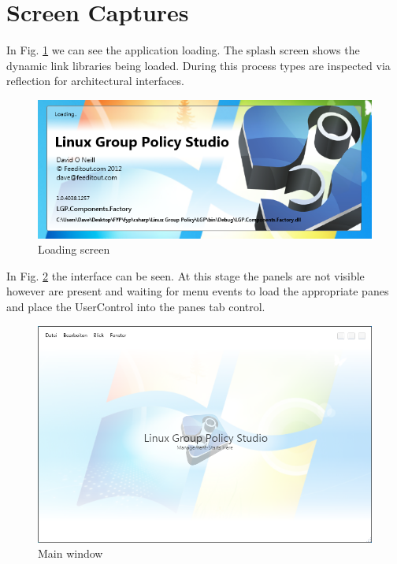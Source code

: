 \section{Screen Captures}

	\normalsize
	{
		In Fig. \ref{fig:SSLoadingScreen} we can see the application loading.  
		The splash screen shows the dynamic link libraries being loaded.  During this process
		types are inspected via reflection for architectural interfaces.
		\newline			
	}

	\begin{figure}[h!]
		\centering
		\includegraphics[scale=0.9]{pages/appendix3/figures/lgpscreens/loading.png}
		\caption{Loading screen}
		\label{fig:SSLoadingScreen}
	\end{figure}
		
	\normalsize
	{
		In Fig. \ref{fig:SSWindow} the interface can be seen.  At this stage the panels
		are not visible however are present and waiting for menu events to load the appropriate panes
		and place the UserControl into the panes tab control.
		\newline			
	}
		
	\begin{figure}[h!]
		\centering
		\includegraphics[scale=0.70]{pages/appendix3/figures/lgpscreens/main.png}
		\caption{Main window}
		\label{fig:SSWindow}
	\end{figure}
	
